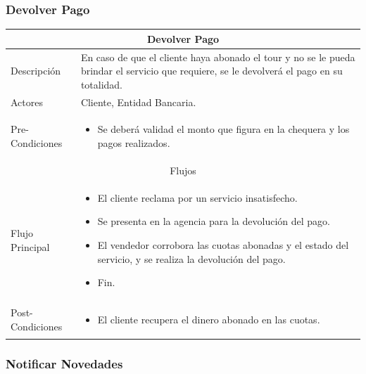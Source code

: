 \documentclass[12pt,a4paper]{article}
\newenvironment{myitemize}
{\begin{itemize}[leftmargin=*,noitemsep,topsep=0pt]}{\end{itemize}}
\newenvironment{caseuse}
{\begin{center}\begin{tabular}{|l|p{10cm}|}}{\end{tabular}\end{center}}
\begin{document}
		\subsubsection{Devolver Pago}

			\begin{caseuse}
				\hline
				\multicolumn{2}{|c|}{Devolver Pago} \\ \hline

				Descripción & En caso de que el cliente haya abonado el tour y no se le pueda brindar el servicio que requiere, se le devolverá el pago en su totalidad. \\ \hline

				Actores & Cliente, Entidad Bancaria. \\ \hline

				Pre-Condiciones & 
					\begin{myitemize}
						\item Se deberá validad el monto que figura en la chequera y los pagos realizados.
					\end{myitemize} \\ \hline

				\multicolumn{2}{|c|}{Flujos} \\ \hline

				Flujo Principal &
					\begin{myitemize}
						\item El cliente reclama por un servicio insatisfecho.
						\item Se presenta en la agencia para la devolución del pago.
						\item El vendedor corrobora las cuotas abonadas y el estado del servicio, y se realiza la devolución del pago.
						\item Fin.
					\end{myitemize} \\ \hline

				Post-Condiciones &
					\begin{myitemize}
						\item El cliente recupera el dinero abonado en las cuotas.
					\end{myitemize}\\ \hline
			\end{caseuse}	

		\subsubsection{Notificar Novedades}
\end{document}
